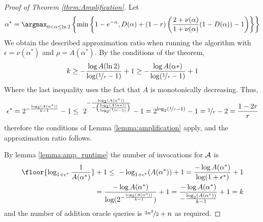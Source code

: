 \begin{proof}[Proof of Theorem \ref{thrm:Amplification}]
	Let $$\alpha^*  = \argmax _{0<\alpha \leq \ln{2}} \left\{ \min \left\{ 1-e^{-\alpha},D(\alpha)+(1-r)\left( \frac{2+\nu(\alpha)}{1+\nu(\alpha)} (1-D(\alpha)) -1\right)\right\}\right\}$$
	We obtain the described approximation ratio when running the algorithm
	with $\epsilon = \nu(\alpha^*)$ and $\rho = A(\alpha^*)$.
	By the conditions of the theorem,
	$$k \geq -\frac{\log A(\ln 2)} { \log(\nicefrac[]{1}{r} -1 ) } +1 \geq-\frac{\log A(\alpha*)} { \log(\nicefrac[]{1}{r} -1 ) } +1 $$
	Where the last inequality uses the fact that $A$ is monotonically decreasing.  Thus,
	$$\epsilon^* = 2 ^{-\frac{\log_2 (A(\alpha^*))}{k-1}} -1 \leq \
	2 ^{-\frac{ \log_2(A(\alpha^*))}{  -\left(\frac{\log_2(A(\alpha* ))}{\log_2(\nicefrac[]{1}{r}-1)} \right) }} -1  =
	2^{\log_2(\nicefrac[]{1}{r}-1)} -1 = \nicefrac[]{1}{r}-2 = \frac{1-2r}{r} $$
	therefore the conditions of Lemma \ref{lemma:amplification} apply,
	and the approximation ratio follows.
	
	By lemma \ref{lemma:amp_runtime} the number of invocations for $\mathcal{A}$
	is
	\begin{align*}
	\floor{\log_{1+\epsilon^*} \frac{1}{A(\alpha^*)}}+1 \leq \
	-\log_{1+\epsilon^*} (A(\alpha^*)) +1 =
	\frac{-\log A(\alpha^*)} {\log(1+\epsilon^*)} +1 \\
	= \frac{-\log {A(\alpha^*)}} {\log(2 ^{-\frac{\log_2 (A(\alpha^*))}{k-1}} )} +1
	= \frac{-\log {A(\alpha^*)}} {-\frac{\log_2 (A(\alpha^*))}{k-1}} +1
	= k \end{align*}
	and the number of addition oracle queries is $\nicefrac[]{3n^2}{2} + n $
	as required.
	
\end{proof}

